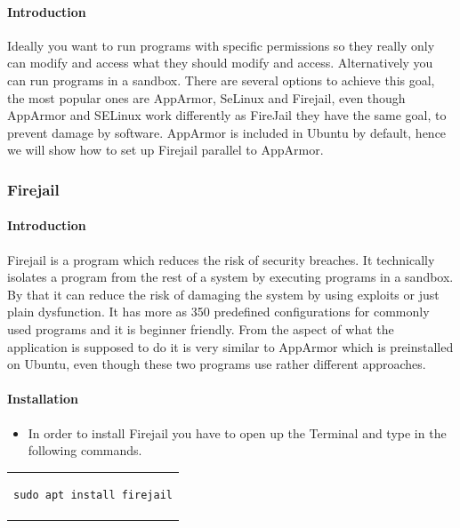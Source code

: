 \documentclass[a4paper,10pt]{article}
\begin{document}
\paragraph{Introduction}
Ideally you want to run programs with specific permissions so they really only can modify and access what they should modify and access. Alternatively you can run programs in a sandbox. There are several options to achieve this goal, the most popular ones are AppArmor, SeLinux and Firejail, even though AppArmor and SELinux work differently as FireJail they have the same goal, to prevent damage by software. AppArmor is included in Ubuntu by default, hence we will show how to set up Firejail parallel to AppArmor.

\subsubsection{Firejail}
\paragraph{Introduction}
Firejail is a program which reduces the risk of security breaches. It technically isolates a program from the rest of a system by executing programs in a sandbox. By that it can reduce the risk of damaging the system by using exploits or just plain dysfunction. It has more as 350 predefined configurations for commonly used programs and it is beginner friendly. From the aspect of what the application is supposed to do it is very similar to AppArmor which is preinstalled on Ubuntu, even though these two programs use rather different approaches.

\paragraph{Installation}

\begin{itemize}[leftmargin=*]
\item In order to install Firejail you have to open up the Terminal and type in the following commands.
\end{itemize}

\begin{center}
\begin{tabular}{c}
\begin{lstlisting}
sudo apt install firejail
\end{lstlisting}
\end{tabular}
\end{center}
\end{document}
